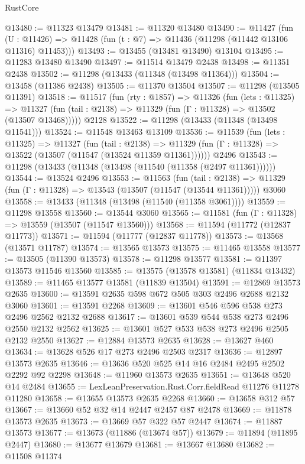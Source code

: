 \begin{lexlean}{RustCore}
\begin{coremodule}
@13480 := @11323 @13479
@13481 := @11320 @13480
@13490 := @11427
    (fun (U : @11426) => @11428 (fun (t : @7) => @11436 (@11298 (@11442 @13106 @11316) @11453)))
@13493 := @13455 (@13481 @13490) @13104
@13495 := @11283 @13480 @13490
@13497 := @11514 @13479 @2438
@13498 := @11351 @2438
@13502 := @11298 (@13433 (@11348 (@13498 @11364)))
@13504 := @13458 (@11386 @2438)
@13505 := @11370 @13504
@13507 := @11298 (@13505 @11391)
@13518 := @11517
    (fun (rty : @1857) =>
    @11326
      (fun (lets : @11325) =>
      @11327 (fun (tail : @2138) => @11329 (fun (Γ : @11328) => @13502 (@13507 @13468)))))
    @2128
@13522 := @11298 (@13433 (@11348 (@13498 @11541)))
@13524 := @11548 @13463 @13109
@13536 := @11539
    (fun (lets : @11325) =>
    @11327
      (fun (tail : @2138) =>
      @11329 (fun (Γ : @11328) => @13522 (@13507 (@11547 (@13524 @11359 @11361))))))
    @2496
@13543 := @11298 (@13433 (@11348 (@13498 (@11540 (@11358 (@2497 @11361))))))
@13544 := @13524 @2496
@13553 := @11563
    (fun (tail : @2138) => @11329 (fun (Γ : @11328) => @13543 (@13507 (@11547 (@13544 @11361)))))
    @3060
@13558 := @13433 (@11348 (@13498 (@11540 (@11358 @3061))))
@13559 := @11298 @13558
@13560 := @13544 @3060
@13565 := @11581 (fun (Γ : @11328) => @13559 (@13507 (@11547 @13560)))
@13568 := @11594 (@11772 (@12837 @11773))
@13571 := @11594 (@11777 (@12837 @11778))
@13573 := @13568 (@13571 @11787)
@13574 := @13565 @13573
@13575 := @11465 @13558
@13577 := @13505 (@11390 @13573)
@13578 := @11298 @13577
@13581 := @11397 @13573 @11546 @13560
@13585 := @13575 (@13578 @13581) (@11834 @13432)
@13589 := @11465 @13577 @13581 (@11839 @13504)
@13591 := @12869 @13573 @2635
@13600 := @13591 @2635 @598 @672 @505 @303 @2496 @2688 @2132 @3060
@13601 := @13591 @2268
@13609 := @13601 @546 @596 @538 @273 @2496 @2562 @2132 @2688
@13617 := @13601 @539 @544 @538 @273 @2496 @2550 @2132 @2562
@13625 := @13601 @527 @533 @538 @273 @2496 @2505 @2132 @2550
@13627 := @12884 @13573 @2635
@13628 := @13627 @460
@13634 := @13628 @526 @17 @273 @2496 @2503 @2317
@13636 := @12897 @13573 @2635
@13646 := @13636 @520 @525 @14 @16 @2484 @2495 @2502 @2292 @92 @2298
@13648 := @11960 @13573 @2635
@13651 := @13648 @520 @14 @2484
@13655 := LexLeanPreservation.Rust.Corr.fieldRead @11276 @11278 @11280
@13658 := @13655 @13573 @2635 @2268
@13660 := @13658 @312 @57
@13667 := @13660 @52 @32 @14 @2447 @2457 @87 @2478
@13669 := @11878 @13573 @2635
@13673 := @13669 @57 @322 @57 @2447
@13674 := @11887 @13573
@13677 := @13673 (@11886 (@13674 @57))
@13679 := @11894 (@11895 @2447)
@13680 := @13677 @13679
@13681 := @13667 @13680
@13682 := @11508 @11374

\end{coremodule}
\end{lexlean}
